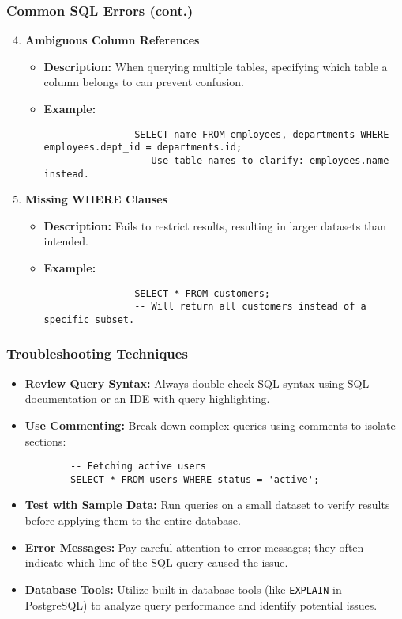\documentclass[aspectratio=169]{beamer}
\begin{document}
\begin{frame}[fragile]
    \frametitle{Common SQL Errors (cont.)}
    \begin{enumerate}
        \setcounter{enumi}{3}
        \item \textbf{Ambiguous Column References}
            \begin{itemize}
                \item \textbf{Description:} When querying multiple tables, specifying which table a column belongs to can prevent confusion.
                \item \textbf{Example:}
                \begin{lstlisting}
                SELECT name FROM employees, departments WHERE employees.dept_id = departments.id;
                -- Use table names to clarify: employees.name instead.
                \end{lstlisting}
            \end{itemize}

        \item \textbf{Missing WHERE Clauses}
            \begin{itemize}
                \item \textbf{Description:} Fails to restrict results, resulting in larger datasets than intended.
                \item \textbf{Example:} 
                \begin{lstlisting}
                SELECT * FROM customers; 
                -- Will return all customers instead of a specific subset.
                \end{lstlisting}
            \end{itemize}
    \end{enumerate}
\end{frame}

\begin{frame}[fragile]
    \frametitle{Troubleshooting Techniques}
    \begin{itemize}
        \item \textbf{Review Query Syntax:} Always double-check SQL syntax using SQL documentation or an IDE with query highlighting.
        \item \textbf{Use Commenting:} Break down complex queries using comments to isolate sections:
        \begin{lstlisting}
        -- Fetching active users
        SELECT * FROM users WHERE status = 'active'; 
        \end{lstlisting}
        \item \textbf{Test with Sample Data:} Run queries on a small dataset to verify results before applying them to the entire database.
        \item \textbf{Error Messages:} Pay careful attention to error messages; they often indicate which line of the SQL query caused the issue.
        \item \textbf{Database Tools:} Utilize built-in database tools (like \texttt{EXPLAIN} in PostgreSQL) to analyze query performance and identify potential issues.
    \end{itemize}
\end{frame}
\end{document}
